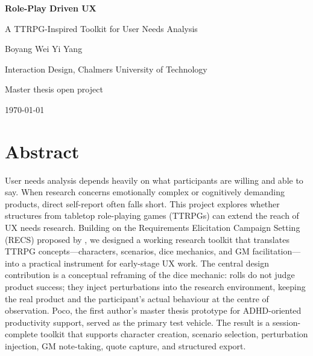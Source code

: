 \documentclass[12pt,a4paper]{report}
\begin{document}
\begin{titlepage}
  \centering
  \vspace*{35mm}
  {\Huge\bfseries\color{ChalmersBlue} Role-Play Driven UX\par}
  \vspace{8mm}
  {\Large A TTRPG-Inspired Toolkit for User Needs Analysis\par}
  \vspace{18mm}
  {\large Boyang Wei \quad Yi Yang\par}
  \vspace{4mm}
  {\normalsize Interaction Design, Chalmers University of Technology\par}
  \vspace{6mm}
  {\normalsize Master thesis open project\par}
  \vfill
  {\large \today\par}
\end{titlepage}


\chapter*{Abstract}

User needs analysis depends heavily on what participants are willing and able to say.
When research concerns emotionally complex or cognitively demanding products, direct
self-report often falls short.
This project explores whether structures from tabletop role-playing games (TTRPGs) can
extend the reach of UX needs research.
Building on the Requirements Elicitation Campaign Setting (RECS) proposed by
\citet{sturdee2023ttrpg}, we designed a working research toolkit that translates TTRPG
concepts---characters, scenarios, dice mechanics, and GM facilitation---into a practical
instrument for early-stage UX work.
The central design contribution is a conceptual reframing of the dice mechanic: rolls do
not judge product success; they inject perturbations into the research environment,
keeping the real product and the participant's actual behaviour at the centre of
observation.
Poco, the first author's master thesis prototype for ADHD-oriented productivity support,
served as the primary test vehicle.
The result is a session-complete toolkit that supports character creation, scenario
selection, perturbation injection, GM note-taking, quote capture, and structured export.
\end{document}
